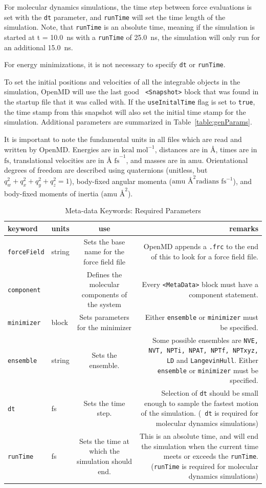 \documentclass[letterpaper]{report}
\begin{document}
For molecular dynamics simulations, the time step between force
evaluations is set with the {\tt dt} parameter, and {\tt runTime} will
set the time length of the simulation. Note, that {\tt runTime} is an
absolute time, meaning if the simulation is started at t = 10.0~ns
with a {\tt runTime} of 25.0~ns, the simulation will only run for an
additional 15.0~ns.  

For energy minimizations, it is not necessary to specify {\tt dt} or
{\tt runTime}.

To set the initial positions and velocities of all the integrable
objects in the simulation, OpenMD will use the last good {\tt
<Snapshot>} block that was found in the startup file that it was
called with.  If the {\tt useInitalTime} flag is set to {\tt true},
the time stamp from this snapshot will also set the initial time stamp
for the simulation.  Additional parameters are summarized in
Table~\ref{table:genParams}.

It is important to note the fundamental units in all files which are
read and written by OpenMD.  Energies are in $\mbox{kcal
mol}^{-1}$, distances are in $\mbox{\AA}$, times are in $\mbox{fs}$,
translational velocities are in $\mbox{\AA~fs}^{-1}$, and masses are
in $\mbox{amu}$.  Orientational degrees of freedom are described using
quaternions (unitless, but $q_w^2 + q_x^2 + q_y^2 + q_z^2 = 1$),
body-fixed angular momenta ($\mbox{amu \AA}^{2} \mbox{radians
fs}^{-1}$), and body-fixed moments of inertia ($\mbox{amu \AA}^{2}$). 

\begin{longtable}[c]{ABCD}
\caption{Meta-data Keywords: Required Parameters}
\\
{\bf keyword} & {\bf units} & {\bf use} & {\bf remarks}  \\ \hline
\endhead
\hline
\endfoot
{\tt forceField} & string & Sets the base name for the force field file &
OpenMD appends a {\tt .frc} to the end of this to look for a force
field file.\\
{\tt component} & & Defines the molecular components of the system &
Every {\tt <MetaData>} block must have a component statement. \\
{\tt minimizer} & block & Sets parameters for the minimizer & Either {\tt ensemble} or {\tt minimizer} must be specified. \\
{\tt ensemble} & string & Sets the ensemble. & Some possible ensembles are
{\tt NVE, NVT, NPTi, NPAT, NPTf, NPTxyz, LD} and {\tt LangevinHull}.  Either {\tt ensemble}
or {\tt minimizer} must be specified. \\
{\tt dt} & fs & Sets the time step. & Selection of {\tt dt} should be
small enough to sample the fastest motion of the simulation. ({\tt
dt} is required for molecular dynamics simulations)\\
{\tt runTime} & fs & Sets the time at which the simulation should
end. & This is an absolute time, and will end the simulation when the
current time meets or exceeds the {\tt runTime}. ({\tt runTime} is
required for molecular dynamics simulations)
\label{table:reqParams}
\end{longtable}
\end{document}
